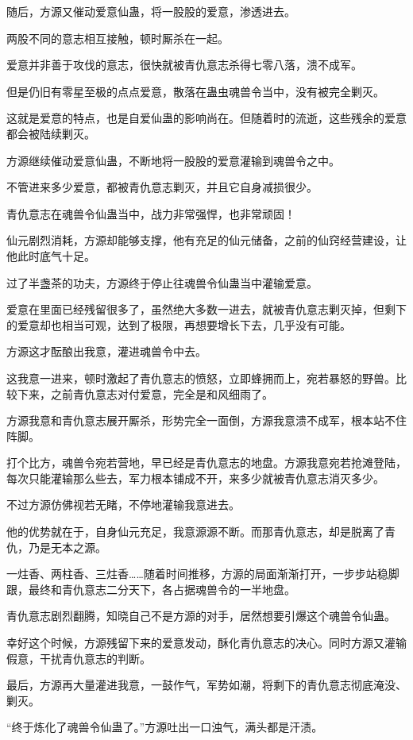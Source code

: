 \begin{this_body}
随后，方源又催动爱意仙蛊，将一股股的爱意，渗透进去。

两股不同的意志相互接触，顿时厮杀在一起。

爱意并非善于攻伐的意志，很快就被青仇意志杀得七零八落，溃不成军。

但是仍旧有零星至极的点点爱意，散落在蛊虫魂兽令当中，没有被完全剿灭。

这就是爱意的特点，也是自爱仙蛊的影响尚在。但随着时的流逝，这些残余的爱意都会被陆续剿灭。

方源继续催动爱意仙蛊，不断地将一股股的爱意灌输到魂兽令之中。

不管进来多少爱意，都被青仇意志剿灭，并且它自身减损很少。

青仇意志在魂兽令仙蛊当中，战力非常强悍，也非常顽固！

仙元剧烈消耗，方源却能够支撑，他有充足的仙元储备，之前的仙窍经营建设，让他此时底气十足。

过了半盏茶的功夫，方源终于停止往魂兽令仙蛊当中灌输爱意。

爱意在里面已经残留很多了，虽然绝大多数一进去，就被青仇意志剿灭掉，但剩下的爱意却也相当可观，达到了极限，再想要增长下去，几乎没有可能。

方源这才酝酿出我意，灌进魂兽令中去。

这我意一进来，顿时激起了青仇意志的愤怒，立即蜂拥而上，宛若暴怒的野兽。比较下来，之前青仇意志对付爱意，完全是和风细雨了。

方源我意和青仇意志展开厮杀，形势完全一面倒，方源我意溃不成军，根本站不住阵脚。

打个比方，魂兽令宛若营地，早已经是青仇意志的地盘。方源我意宛若抢滩登陆，每次只能灌输那么些去，军力根本铺成不开，来多少就被青仇意志消灭多少。

不过方源仿佛视若无睹，不停地灌输我意进去。

他的优势就在于，自身仙元充足，我意源源不断。而那青仇意志，却是脱离了青仇，乃是无本之源。

一炷香、两柱香、三炷香……随着时间推移，方源的局面渐渐打开，一步步站稳脚跟，最终和青仇意志二分天下，各占据魂兽令的一半地盘。

青仇意志剧烈翻腾，知晓自己不是方源的对手，居然想要引爆这个魂兽令仙蛊。

幸好这个时候，方源残留下来的爱意发动，酥化青仇意志的决心。同时方源又灌输假意，干扰青仇意志的判断。

最后，方源再大量灌进我意，一鼓作气，军势如潮，将剩下的青仇意志彻底淹没、剿灭。

“终于炼化了魂兽令仙蛊了。”方源吐出一口浊气，满头都是汗渍。


\end{this_body}

